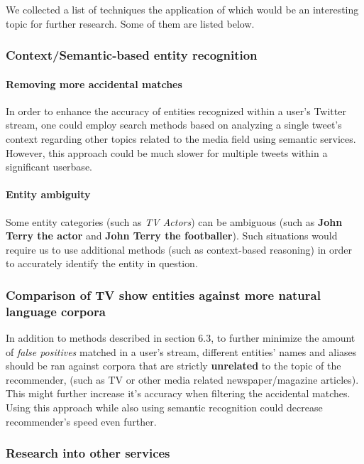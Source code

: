 We collected a list of techniques the application of which would be an
interesting topic for further research. Some of them are listed below.

\subsubsection{Context/Semantic-based entity recognition}

\paragraph{Removing more accidental matches}

In order to enhance the accuracy of entities recognized within a user's Twitter
stream, one could employ search methods based on analyzing a single tweet's
context regarding other topics related to the media field using semantic
services.  However, this approach could be much slower for multiple tweets
within a significant userbase.

\paragraph{Entity ambiguity}

Some entity categories (such as \textit{TV Actors}) can be ambiguous (such as \textbf{John Terry the actor} and \textbf{John Terry the footballer}). Such situations
would require us to use additional methods (such as context-based reasoning) in order to accurately identify the entity in question.

\subsubsection{Comparison of TV show entities against more natural language corpora}

In addition to methods described in section 6.3, to further minimize the amount of \textit{false positives}
matched in a user's stream, different entities' names and aliases should be ran against corpora
that are strictly \textbf{unrelated} to the topic of the recommender, (such as TV or other media related
newspaper/magazine articles). This might further increase it's accuracy when filtering the accidental
matches. Using this approach while also using semantic recognition could decrease recommender's
speed even further.

\subsubsection{Research into other services}

